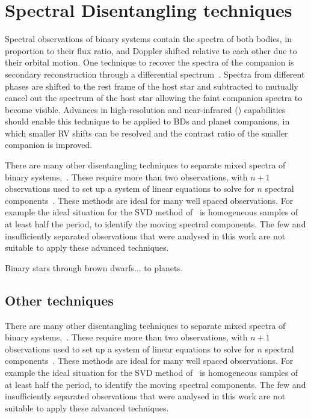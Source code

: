 
\section{Spectral Disentangling techniques}
\label{sec:disentangling_techniques}

Spectral observations of binary systems contain the spectra of both bodies, in proportion to their flux ratio, and Doppler shifted relative to each other due to their orbital motion.
One technique to recover the spectra of the companion is secondary reconstruction through a differential spectrum~\citep{ferluga_separating_1997}.
Spectra from different phases are shifted to the rest frame of the host star and subtracted to mutually cancel out the spectrum of the host star allowing the faint companion spectra to become visible.
Advances in high-resolution and near-infrared (\nir{}) capabilities should enable this technique to be applied to {BD}s and planet companions, in which smaller {RV} shifts can be resolved and the contrast ratio of the smaller companion is improved.


There are many other disentangling techniques to separate mixed spectra of binary systems,~\citep[e.g.][]{hadrava_disentangling_2009}.
These require more than two observations, with  \(n+1\) observations used to set up a system of linear equations to solve for \(n\) spectral components~\citep[e.g.][]{simon_disentangling_1994,czekala_disentangling_2017, sablowski_spectral_2016}.
These methods are ideal for many well spaced observations.
For example the ideal situation for the {SVD} method of~\citet{sablowski_spectral_2016} is homogeneous samples of at least half the period, to identify the moving spectral components.
The few and insufficiently separated observations that were analysed in this work are not suitable to apply these advanced techniques.


Binary stars through brown dwarfs...
to planets.


\subsection{Other techniques}
There are many other disentangling techniques to separate mixed spectra of binary systems,~\citep[e.g.][]{hadrava_disentangling_2009}.
These require more than two observations, with  \(n+1\) observations used to set up a system of linear equations to solve for \(n\) spectral components~\citep[e.g.][]{simon_disentangling_1994,czekala_disentangling_2017, sablowski_spectral_2016}.
These methods are ideal for many well spaced observations.
For example the ideal situation for the {SVD} method of~\citet{sablowski_spectral_2016} is homogeneous samples of at least half the period, to identify the moving spectral components.
The few and insufficiently separated observations that were analysed in this work are not suitable to apply these advanced techniques.

